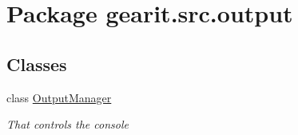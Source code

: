 \hypertarget{namespacegearit_1_1src_1_1output}{\section{Package gearit.\+src.\+output}
\label{namespacegearit_1_1src_1_1output}
}
\subsection*{Classes}
\begin{DoxyCompactItemize}
\item 
class \hyperlink{classgearit_1_1src_1_1output_1_1_output_manager}{Output\+Manager}
\begin{DoxyCompactList}\small\item\em That controls the console \end{DoxyCompactList}\end{DoxyCompactItemize}
